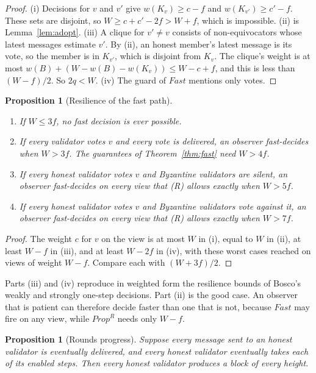 \documentclass[11pt]{article}
\newtheorem{proposition}[theorem]{Proposition}
\theoremstyle{definition}
\theoremstyle{remark}
\begin{document}
\begin{proof}
(i) Decisions for $v$ and $v'$ give $w(K_v)\ge c-f$ and $w(K_{v'})\ge c'-f$.
These sets are disjoint, so $W\ge c+c'-2f>W+f$, which is impossible.
(ii) is Lemma~\ref{lem:adopt}.
(iii) A clique for $v'\ne v$ consists of non-equivocators whose latest
messages estimate $v'$. By (ii), an honest member's latest message is its
vote, so the member is in $K_{v'}$, which is disjoint from $K_v$. The clique's
weight is at most $w(B)+(W-w(B)-w(K_v))\le W-c+f$, and this is less than
$(W-f)/2$. So $2q<W$.
(iv) The guard of $\mathit{Fast}$ mentions only votes.
\end{proof}

\begin{proposition}[Resilience of the fast path]\label{prop:resil}
\begin{enumerate}[label=(\roman*)]
\item If $W\le3f$, no fast decision is ever possible.
\item If every validator votes $v$ and every vote is delivered, an observer
  fast-decides when $W>3f$. The guarantees of Theorem~\ref{thm:fast} need
  $W>4f$.
\item If every honest validator votes $v$ and Byzantine validators are silent,
  an observer fast-decides on every view that (R) allows exactly when
  $W>5f$.
\item If every honest validator votes $v$ and Byzantine validators vote
  against it, an observer fast-decides on every view that (R) allows exactly
  when $W>7f$.
\end{enumerate}
\end{proposition}

\begin{proof}
The weight $c$ for $v$ on the view is at most $W$ in (i), equal to $W$ in (ii),
at least $W-f$ in (iii), and at least $W-2f$ in (iv), with these worst cases
reached on views of weight $W-f$. Compare each with $(W+3f)/2$.
\end{proof}

Parts (iii) and (iv) reproduce in weighted form the resilience bounds of Bosco's
weakly and strongly one-step decisions. Part (ii) is the good case. An
observer that is patient can therefore decide faster than one that is not,
because $\mathit{Fast}$ may fire on any view, while $\mathit{Prop}^R$ needs
only $W-f$.

\begin{proposition}[Rounds progress]
Suppose every message sent to an honest validator is eventually delivered, and
every honest validator eventually takes each of its enabled steps. Then every
honest validator produces a block of every height.
\end{proposition}
\end{document}
